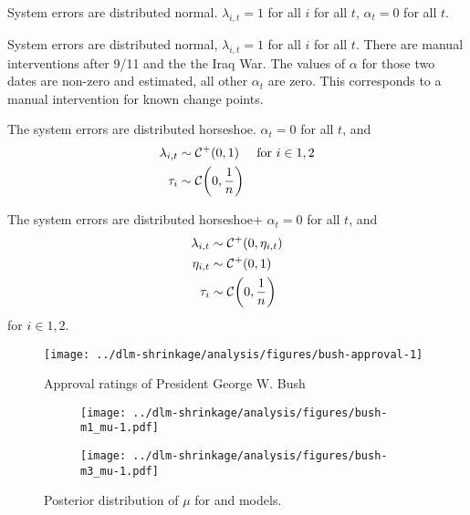 \begin{description}[font = \normalfont\ModelII]
\item[Normal]
  System errors are distributed normal.
  $\lambda_{i, t} = 1$  for all $i$ for all $t$, $\alpha_{t} = 0$ for all $t$.
\item[Intervention]
  System errors are distributed normal, $\lambda_{i, t} = 1$  for all $i$ for all $t$.
  There are manual interventions after 9/11 and the the Iraq War. 
  The values of $\alpha$ for those two dates are non-zero and estimated, all other $\alpha_{t}$ are zero.
  This corresponds to a manual intervention for known change points.
\item[Horseshoe] The system errors are distributed horseshoe. $\alpha_{t} = 0$ for all $t$, and 
  \begin{equation}
    \label{dlm:eq:27}
    \begin{aligned}[t]
    \lambda_{i, t} & \sim \mathcal{C^+}\mathopen{}\left(0, 1\right)\mathclose{} & \text{for $i \in 1, 2$} \\
    \tau_{i} & \sim \mathcal{C}\mathopen{}\left(0, \frac{1}{n}\right)\mathclose{}
    \end{aligned}
  \end{equation}
\item[Horseshoe+] The system errors are distributed horseshoe+ $\alpha_{t}= 0$ for all $t$, and
  \begin{equation}
    \label{dlm:eq:25}
    \begin{aligned}
    \lambda_{i, t} & \sim \mathcal{C^+}\mathopen{}\left(0, \eta_{i, t}\right)\mathclose{}  \\
    \eta_{i, t} & \sim \mathcal{C^+}\mathopen{}\left(0, 1\right)\mathclose{} \\
    \tau_{i} & \sim \mathcal{C}\mathopen{}\left(0, \frac{1}{n}\right)\mathclose{}
    \end{aligned}
  \end{equation}
  for $i \in 1, 2$.
\end{description}


\begin{figure}[thbp!]
  \centering
  \texttt{[image: ../dlm-shrinkage/analysis/figures/bush-approval-1]}
  \caption{Approval ratings of President George W. Bush}
  \label{dlm:fig:bush_approval}
\end{figure}

\begin{figure}[thbp!]
  \centering
  \begin{subfigure}[b]{\linewidth}
    \texttt{[image: ../dlm-shrinkage/analysis/figures/bush-m1\_mu-1.pdf]}
    \caption{}
  \end{subfigure}

  \begin{subfigure}[b]{\linewidth}
    \texttt{[image: ../dlm-shrinkage/analysis/figures/bush-m3\_mu-1.pdf]}
    \caption{}
  \end{subfigure}
  \caption{Posterior distribution of $\mu$ for  and  models.}
  \label{dlm:fig:bush_mu1}
\end{figure}

